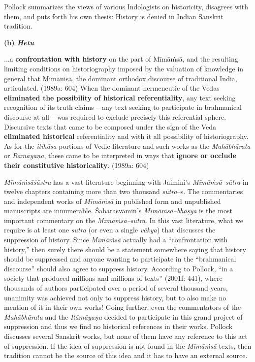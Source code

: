 Pollock summarizes the views of various Indologists on historicity, disagrees with them, and puts forth his own thesis: History is denied in Indian Sanskrit tradition.

\textbf{(b) \textit{Hetu}}

\begin{myquote}
...a \textbf{confrontation with history} on the part of Mīmāṁsā, and the resulting limiting conditions on historiography imposed by the valuation of knowledge in general that Mīmāṁsā, the dominant orthodox discourse of traditional India, articulated. (1989a: 604) When the dominant hermeneutic of the Vedas \textbf{eliminated the possibility of historical referentiality}, any text seeking recognition of its truth claims – any text seeking to participate in brahmanical discourse at all – was required to exclude precisely this referential sphere. Discursive texts that came to be composed under the sign of the Veda \textbf{eliminated historical} referentiality and with it all possibility of historiography. As for the \textit{itihāsa} portions of Vedic literature and such works as the \textit{Mahābhārata} or \textit{Rāmāyaṇa}, these came to be interpreted in ways that \textbf{ignore or occlude their constitutive historicality}. (1989a: 604)
\end{myquote}

\textit{Mīmāṁsāśāstra} has a vast literature beginning with Jaimini’s \textit{Mīmāṁsā–sūtra} in twelve chapters containing more than two thousand \textit{sūtra}–s. The commentaries and independent works of \textit{Mīmāṁsā} in published form and unpublished manuscripts are innumerable. Śabarasvāmin’s \textit{Mīmāṁsā–bhāṣya} is the most important commentary on the \textit{Mīmāṁsā–sūtra}. In this vast literature, what we require is at least one \textit{sutra }(or even a single \textit{vākya}) that discusses the suppression of history. Since \textit{Mīmāṁsā} actually had a “confrontation with history,” then surely there should be a statement somewhere saying that history should be suppressed and anyone wanting to participate in the “brahmanical discourse” should also agree to suppress history. According to Pollock, “in a society that produced millions and millions of texts” (2001f: 441), where thousands of authors participated over a period of several thousand years, unanimity was achieved not only to suppress history, but to also make no mention of it in their own works! Going further, even the commentators of the \textit{Mahābhārata} and the \textit{Rāmāyaṇa }decided to participate in this grand project of suppression and thus we find no historical references in their works. Pollock discusses several Sanskrit works, but none of them have any reference to this act of suppression. If the idea of suppression is not found in the\textit{ Mīmāṁsā} texts, then tradition cannot be the source of this idea and it has to have an external source.

